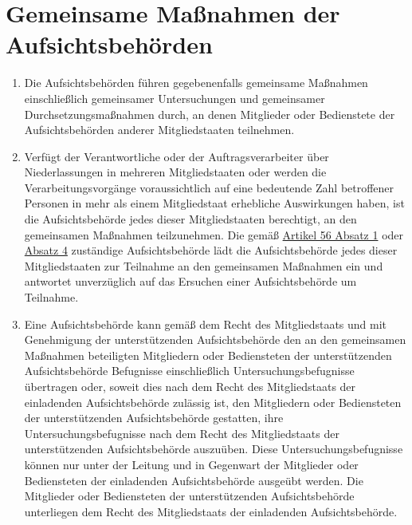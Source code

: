 \chapter{Gemeinsame Maßnahmen der Aufsichtsbehörden}
\label{ch:62}


\begin{enumerate}

  \item Die Aufsichtsbehörden führen gegebenenfalls gemeinsame Maßnahmen einschließlich gemeinsamer Untersuchungen und
   gemeinsamer Durchsetzungsmaßnahmen durch, an denen Mitglieder oder Bedienstete der Aufsichtsbehörden anderer
   Mitgliedstaaten teilnehmen.
  \label{itm:62-1}

  \item Verfügt der Verantwortliche oder der Auftragsverarbeiter über Niederlassungen in mehreren Mitgliedstaaten oder
   werden die Verarbeitungsvorgänge voraussichtlich auf eine bedeutende Zahl betroffener Personen in mehr als einem
   Mitgliedstaat erhebliche Auswirkungen haben, ist die Aufsichtsbehörde jedes dieser Mitgliedstaaten berechtigt, an
   den gemeinsamen Maßnahmen teilzunehmen. Die gemäß \hyperref[itm:56-1]{Artikel 56 Absatz 1} oder \hyperref[itm:56-4]
   {Absatz 4} zuständige Aufsichtsbehörde lädt die Aufsichtsbehörde jedes dieser Mitgliedstaaten zur Teilnahme an den
   gemeinsamen Maßnahmen ein und antwortet unverzüglich auf das Ersuchen einer Aufsichtsbehörde um Teilnahme.
  \label{itm:62-2}

  \item Eine Aufsichtsbehörde kann gemäß dem Recht des Mitgliedstaats und mit Genehmigung der unterstützenden
   Aufsichtsbehörde den an den gemeinsamen Maßnahmen beteiligten Mitgliedern oder Bediensteten der unterstützenden
   Aufsichtsbehörde Befugnisse einschließlich Untersuchungsbefugnisse übertragen oder, soweit dies nach dem Recht des
   Mitgliedstaats der einladenden Aufsichtsbehörde zulässig ist, den Mitgliedern oder Bediensteten der unterstützenden
   Aufsichtsbehörde gestatten, ihre Untersuchungsbefugnisse nach dem Recht des Mitgliedstaats der unterstützenden
   Aufsichtsbehörde auszuüben. Diese Untersuchungsbefugnisse können nur unter der Leitung und in Gegenwart der
   Mitglieder oder Bediensteten der einladenden Aufsichtsbehörde ausgeübt werden. Die Mitglieder oder Bediensteten der
   unterstützenden Aufsichtsbehörde unterliegen dem Recht des Mitgliedstaats der einladenden Aufsichtsbehörde.
  \label{itm:62-3}


\end{enumerate}
